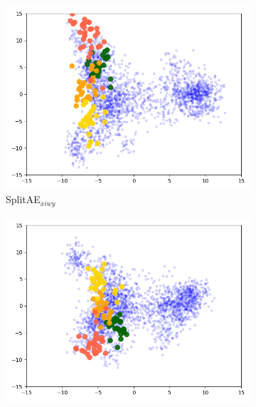 \begin{figure}[t]
\begin{subfigure}[b]{0.45\textwidth}
         \label{fig:vcca_xiwy_comparison}
     \end{subfigure} \\
     \begin{subfigure}[b]{0.45\textwidth}
         \centering
         \includegraphics[width=\textwidth]{figures_and_tables/latent_space_visualizations/splitae_vcca_comparison/pca_latent_peppers_splitae_xiwy_seed2.png}
         \caption{SplitAE$_{xiwy}$}
         \label{fig:splitae_xiwy_bell_peppers_comparison}
     \end{subfigure}
     \begin{subfigure}[b]{0.45\textwidth}
         \centering
         \includegraphics[width=\textwidth]{figures_and_tables/latent_space_visualizations/splitae_vcca_comparison/pca_latent_peppers_vcca_xiwy_seed2.png}

\end{subfigure}
\end{figure}
